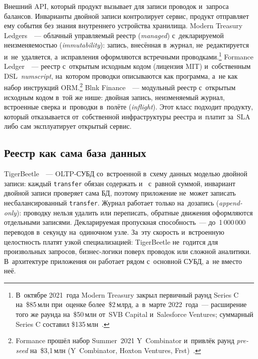 Внешний API, который продукт вызывает для записи проводок и~запроса балансов.
Инварианты двойной записи контролирует сервис, продукт отправляет ему события
без знания внутреннего устройства хранилища. Modern Treasury
Ledgers~\cite{modern-treasury-ledgers}~--- облачный управляемый реестр
(\textit{managed}) с~декларируемой неизменяемостью (\textit{immutability}):
запись, внесённая в~журнал, не~редактируется и~не~удаляется, а~исправления
оформляются встречными проводками.\footnote{В~октябре 2021~года Modern Treasury
  закрыл первичный раунд Series C на~\$85\,млн при~оценке более~\$2\,млрд,
  а~в~марте 2022~года~--- расширение того же раунда на~\$50\,млн от~SVB Capital
  и~Salesforce Ventures; суммарный Series C составил
\$135\,млн~\cite{modern-treasury-funding}.} Formance
Ledger~\cite{formance-ledger}~--- реестр с~открытым исходным кодом
(лицензия MIT) и~собственным DSL~\textit{numscript}, на~котором проводки описываются как
программа, а~не как набор инструкций ORM.\footnote{Formance прошёл набор
  Summer~2021 Y~Combinator и~привлёк раунд \textit{pre-seed} на~\$3{,}1\,млн
(Y~Combinator, Hoxton Ventures, Frst)~\cite{formance-yc}.} Blnk
Finance~\cite{blnk-finance}~--- модульный реестр с~открытым исходным кодом
в~той же нише: двойная запись, неизменяемый журнал, встроенные сверка
и~проводки в~полёте (\textit{inflight}). Этот класс подходит продукту, который
отказывается от~собственной инфраструктуры реестра и~платит за~SLA либо сам
эксплуатирует открытый сервис.

\subsection*{Реестр как сама база данных}

TigerBeetle~\cite{tigerbeetle-debit-credit}~--- OLTP-СУБД со~встроенной в~схему
данных моделью двойной записи: каждый \texttt{transfer} обязан содержать
 и~ с~равной суммой,
инвариант двойной записи проверяет сама БД, поэтому приложение не~может записать
несбалансированный \texttt{transfer}. Журнал работает только на~дозапись (\textit{append-only}): проводку
нельзя удалить или переписать, обратные движения оформляются отдельными
записями. Декларируемая пропускная способность~--- до~1\,000\,000 переводов
в~секунду на~одиночном узле. За~эту скорость и~встроенную целостность платят
узкой специализацией: TigerBeetle не~годится для произвольных запросов,
бизнес-логики поверх проводок или сложной аналитики. В~архитектуре приложения
он работает рядом с~основной СУБД, а~не вместо неё.

